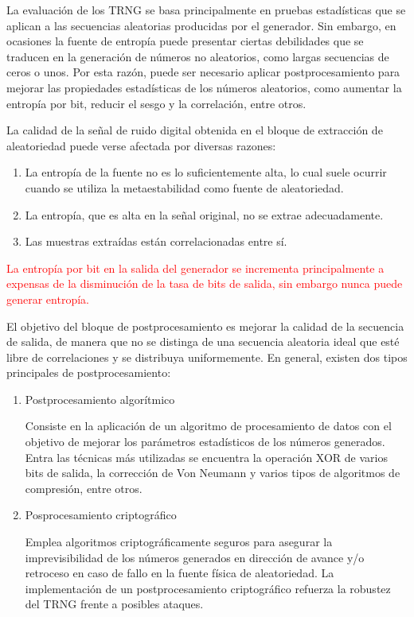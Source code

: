 		        La evaluación de los TRNG se basa principalmente en pruebas estadísticas que se aplican a las secuencias aleatorias producidas por el generador. Sin embargo, en ocasiones la fuente de entropía puede presentar ciertas debilidades que se traducen en la generación de números no aleatorios, como largas secuencias de ceros o unos. Por esta razón, puede ser necesario aplicar postprocesamiento para mejorar las propiedades estadísticas de los números aleatorios, como aumentar la entropía por bit, reducir el sesgo y la correlación, entre otros.
					
                La calidad de la señal de ruido digital obtenida en el bloque de extracción de aleatoriedad puede verse afectada por diversas razones:

                \begin{enumerate}[noitemsep, label=(\alph*)]
                    \item La entropía de la fuente no es lo suficientemente alta, lo cual suele ocurrir cuando se utiliza la metaestabilidad como fuente de aleatoriedad.
                    \item La entropía, que es alta en la señal original, no se extrae adecuadamente.
                    \item Las muestras extraídas están correlacionadas entre sí. 
                \end{enumerate}		

                    \textcolor{red}{La entropía por bit en la salida del generador se incrementa principalmente a expensas de la disminución de la tasa de bits de salida, sin embargo nunca puede generar entropía.}
	
	            El objetivo del bloque de postprocesamiento es mejorar la calidad de la secuencia de salida, de manera que no se distinga de una secuencia aleatoria ideal que esté libre de correlaciones y se distribuya uniformemente. En general, existen dos tipos principales de postprocesamiento:

                \begin{enumerate}
                    \item Postprocesamiento algorítmico

                        Consiste en la aplicación de un algoritmo de procesamiento de datos con el objetivo de mejorar los parámetros estadísticos de los números generados. Entra las técnicas más utilizadas se encuentra la operación XOR de varios bits de salida, la corrección de Von Neumann y varios tipos de algoritmos de compresión, entre otros.
                    \item Posprocesamiento criptográfico 

                        Emplea algoritmos criptográficamente seguros para asegurar la imprevisibilidad de los números generados en dirección de avance y/o retroceso en caso de fallo en la fuente física de aleatoriedad. La implementación de un postprocesamiento criptográfico refuerza la robustez del TRNG frente a posibles ataques.
                \end{enumerate}
		
